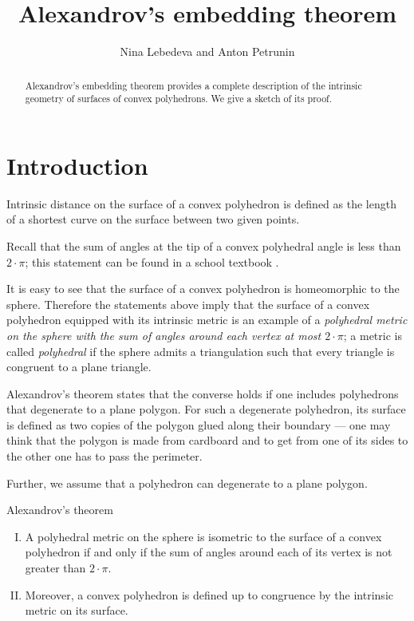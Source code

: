 \documentclass[oneside,a4paper]{article}
\begin{document}

\title{Alexandrov's embedding theorem}
\author{Nina Lebedeva and Anton Petrunin}
\date{}
\maketitle

\begin{abstract}
Alexandrov's embedding theorem provides a complete description of the intrinsic geometry of surfaces of convex polyhedrons.
We give a sketch of its proof.
\end{abstract}

\section{Introduction}

Intrinsic distance on the surface of a convex polyhedron is defined as the length of a shortest curve on the surface between two given points.

Recall that the sum of angles at the tip of a convex polyhedral angle is less than $2\cdot\pi$;
this statement can be found in a school textbook \cite[§~48]{kiselyov-3D}.

It is easy to see that the surface of a convex polyhedron is homeomorphic to the sphere.
Therefore the statements above imply that the surface of a convex polyhedron equipped with its intrinsic metric is an example of a \emph{polyhedral metric on the sphere with the sum of angles around each vertex at most $2\cdot\pi$};
a metric is called \emph{polyhedral} if the sphere admits a triangulation such that every triangle is congruent to a plane triangle.

Alexandrov's theorem states that the converse holds if one includes polyhedrons that degenerate to a plane polygon.
For such a degenerate polyhedron, its surface is defined as two copies of the polygon glued along their boundary --- one may think that the polygon is made from cardboard and to get from one of its sides to the other one has to pass the perimeter.

Further, we assume that a polyhedron can degenerate to a plane polygon.

\begin{thm}{Alexandrov's theorem}
\begin{enumerate}[I.]
\item\label{thm:exist}
A polyhedral metric on the sphere is isometric to the surface of a convex polyhedron if and only if the sum of angles around each of its vertex is not greater than $2\cdot\pi$.

\item\label{thm:unique} 
Moreover, a convex polyhedron is defined up to congruence by the intrinsic metric on its surface.
\end{enumerate}

\end{thm}
\end{document}
